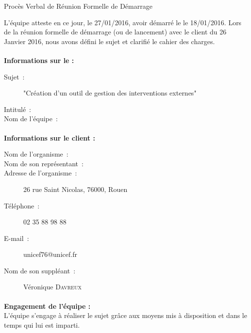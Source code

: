 \documentclass[asi, sansVersion]{picInsa}
\begin{document}
 
 \begin{center}
  \LARGE{}
    Procès Verbal de Réunion Formelle de Démarrage\\
 \end{center}
 
 \normalsize{}
 
L'équipe \nomEquipe{} atteste en ce jour, le 27/01/2016, avoir démarré le \PIC{} le 18/01/2016.
Lors de la réunion formelle de démarrage (ou de lancement) avec le client du 26 Janvier 2016, nous avons défini le sujet et clarifié le cahier des charges.


\paragraph{}
\textbf{Informations sur le \PICCourt{} :}

\begin{description}
  \item[Sujet~:]"Création d'un outil de gestion des interventions externes"
  \item[Intitulé~:]      \PICCourt{} \nomPIC
  \item[Nom de l'équipe~:]  \nomEquipe
\end{description}

\paragraph{}
\textbf{Informations sur le client :}

\begin{description}
\item[Nom de l'organisme~:] \nomPIC
\item[Nom de son représentant~:] \representantClient
\item[Adresse de l'organisme~:] 26 rue Saint Nicolas, 76000, Rouen
\item[Téléphone~:] 02 35 88 98 88
\item[E-mail~:] unicef76@unicef.fr
\item[Nom de son suppléant~:] Véronique \textsc{Davreux}
\end{description}

\paragraph{}
\textbf{Engagement de l'équipe :}\\


L'équipe \nomEquipe{} s'engage à réaliser le sujet grâce aux moyens mis à disposition et dans le temps qui lui est imparti.
\end{document}
